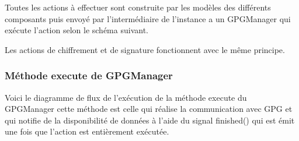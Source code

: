 \documentclass{../res/univ-projet}
\begin{document}
  Toutes les actions à effectuer sont construite par les modèles des différents composants
  puis envoyé par l'intermédiaire de l'instance a un GPGManager qui exécute l'action selon
  le schéma suivant.

  Les actions de chiffrement et de signature fonctionnent avec le même principe.

  \begin{center}
  \end{center}



  \subsubsection{Méthode execute de GPGManager}

  Voici le diagramme de flux de l'exécution de la méthode execute du GPGManager
  cette méthode est celle qui réalise la communication avec GPG et qui notifie de la disponibilité de données
  à l'aide du signal finished() qui est émit une fois que l'action est entièrement exécutée.
\end{document}
